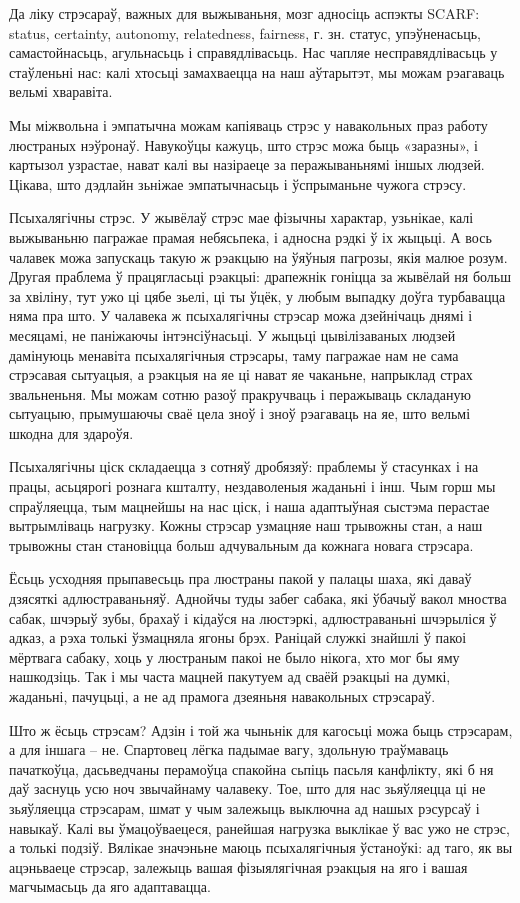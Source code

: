 Да ліку стрэсараў, важных для выжываньня, мозг адносіць аспэкты SCARF: status, certainty, autonomy, relatedness, fairness, г. зн. статус, упэўненасьць, самастойнасьць, агульнасьць і справядлівасьць. Нас чапляе несправядлівасьць у стаўленьні нас: калі хтосьці замахваецца на наш аўтарытэт, мы можам рэагаваць вельмі хваравіта.

Мы міжвольна і эмпатычна можам капіяваць стрэс у навакольных праз работу люстраных нэўронаў. Навукоўцы кажуць, што стрэс можа быць «заразны», і картызол узрастае, нават калі вы назіраеце за перажываньнямі іншых людзей. Цікава, што дэдлайн зьніжае эмпатычнасьць і ўспрыманьне чужога стрэсу.

Псыхалягічны стрэс. У жывёлаў стрэс мае фізычны характар, узьнікае, калі выжываньню пагражае прамая небясьпека, і адносна рэдкі ў іх жыцьці. А вось чалавек можа запускаць такую ж рэакцыю на ўяўныя пагрозы, якія малюе розум. Другая праблема ў працягласьці рэакцыі: драпежнік гоніцца за жывёлай ня больш за хвіліну, тут ужо ці цябе зьелі, ці ты ўцёк, у любым выпадку доўга турбавацца няма пра што. У чалавека ж псыхалягічны стрэсар можа дзейнічаць днямі і месяцамі, не паніжаючы інтэнсіўнасьці. У жыцьці цывілізаваных людзей дамінуюць менавіта псыхалягічныя стрэсары, таму пагражае нам не сама стрэсавая сытуацыя, а рэакцыя на яе ці нават яе чаканьне, напрыклад страх звальненьня. Мы можам сотню разоў пракручваць і перажываць складаную сытуацыю, прымушаючы сваё цела зноў і зноў рэагаваць на яе, што вельмі шкодна для здароўя. 

Псыхалягічны ціск складаецца з сотняў дробязяў: праблемы ў стасунках і на працы, асьцярогі рознага кшталту, нездаволеныя жаданьні і інш. Чым горш мы спраўляецца, тым мацнейшы на нас ціск, і наша адаптыўная сыстэма перастае вытрымліваць нагрузку. Кожны стрэсар узмацняе наш трывожны стан, а наш трывожны стан становіцца больш адчувальным да кожнага новага стрэсара.

Ёсьць усходняя прыпавесьць пра люстраны пакой у палацы шаха, які даваў дзясяткі адлюстраваньняў. Аднойчы туды забег сабака, які ўбачыў вакол мноства сабак, шчэрыў зубы, брахаў і кідаўся на люстэркі, адлюстраваньні шчэрыліся ў адказ, а рэха толькі ўзмацняла ягоны брэх. Раніцай служкі знайшлі ў пакоі мёртвага сабаку, хоць у люстраным пакоі не было нікога, хто мог бы яму нашкодзіць. Так і мы часта мацней пакутуем ад сваёй рэакцыі на думкі, жаданьні, пачуцьці, а не ад прамога дзеяньня навакольных стрэсараў.

Што ж ёсьць стрэсам? Адзін і той жа чыньнік для кагосьці можа быць стрэсарам, а для іншага – не. Спартовец лёгка падымае вагу, здольную траўмаваць пачаткоўца, дасьведчаны перамоўца спакойна сьпіць пасьля канфлікту, які б ня даў заснуць усю ноч звычайнаму чалавеку. Тое, што для нас зьяўляецца ці не зьяўляецца стрэсарам, шмат у чым залежыць выключна ад нашых рэсурсаў і навыкаў. Калі вы ўмацоўваецеся, ранейшая нагрузка выклікае ў вас ужо не стрэс, а толькі подзіў. Вялікае значэньне маюць псыхалягічныя ўстаноўкі: ад таго, як вы ацэньваеце стрэсар, залежыць вашая фізыялягічная рэакцыя на яго і вашая магчымасьць да яго адаптавацца.

